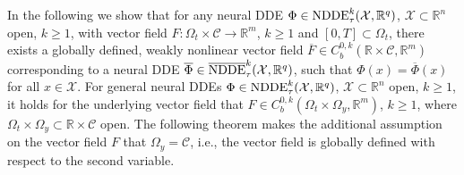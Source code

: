 \documentclass[10pt]{article}
\numberwithin{equation}{section}
\newtheorem{lemma}[theorem]{Lemma}
\newtheorem{remark}[theorem]{Remark}
\begin{document}
	In the following we show that for any neural DDE $\Phi \in \textup{NDDE}_\tau^k(\mathcal{X},\mathbb{R}^q)$, $\mathcal{X}\subset \mathbb{R}^n$ open, $k\geq1$, with vector field $F:\Omega_t \times \mathcal{C}\rightarrow \mathbb{R}^m$, $k\geq 1$ and $ [0,T] \subset \Omega_t$, there exists a globally defined, weakly nonlinear vector field $\overline{F} \in C_b^{0,k}(\mathbb{R}\times \mathcal{C},\mathbb{R}^m)$ corresponding to a neural DDE $\overline{\Phi}\in\overline{\textup{NDDE}}^k_\tau(\mathcal{X},\mathbb{R}^q)$, such that $\Phi(x) = \overline{\Phi}(x)$ for all $x \in \mathcal{X}$. For general neural DDEs $\Phi \in \textup{NDDE}_\tau^k(\mathcal{X},\mathbb{R}^q)$, $\mathcal{X}\subset \mathbb{R}^n$ open, $k\geq1$, it holds for the underlying vector field that $F\in C_b^{0,k}(\Omega_t \times \Omega_y,\mathbb{R}^m)$, $k\geq 1$, where $\Omega_t\times \Omega_y \subset \mathbb{R} \times \mathcal{C}$ open. The following theorem makes the additional assumption on the vector field $F$ that $\Omega_y = \mathcal{C}$, i.e., the vector field is globally defined with respect to the second variable.
	
	
	
	
	
	
\end{document}

